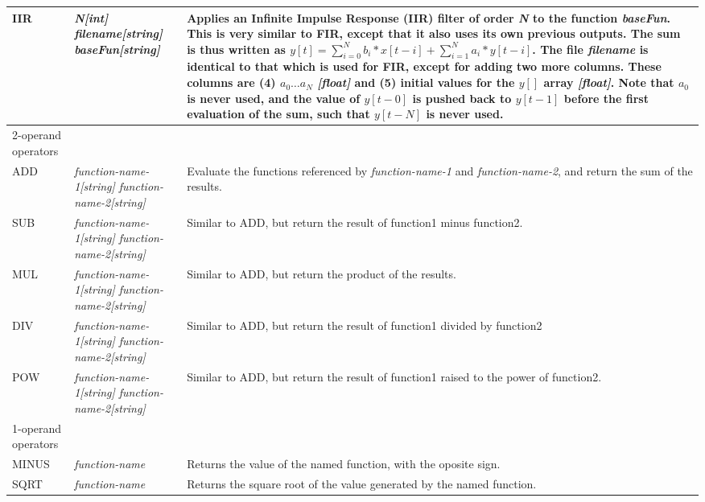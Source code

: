 \begin{center}
\begin{longtable}{|p{2.25cm} | p{4cm} p{9.5cm}|}
  IIR        & \emph{N[int] filename[string] baseFun[string]} &
  Applies an Infinite Impulse Response (IIR) filter of order \emph{N} to the function \emph{baseFun}.
  This is very similar to FIR, except that it also uses its own previous outputs.
  The sum is thus written as $y[t] = \sum_{i=0}^N b_i*x[t-i] + \sum_{i=1}^N a_i*y[t-i]$.
  The file \emph{filename} is identical to that which is used for FIR, except for adding two more columns.
  These columns are (4) $a_0\ldots a_N$ \emph{[float]} and (5) initial values for the $y[]$ array \emph{[float]}.
  Note that $a_0$ is never used, and the value of $y[t-0]$ is pushed back to $y[t-1]$ before the first evaluation of the sum, such that $y[t-N]$ is never used.\\

  \hline
  \rowcolor{blue!15}
  2-operand operators & & \\*

  ADD        & \emph{function-name-1[string] function-name-2[string]} &
  Evaluate the functions referenced by \emph{function-name-1} and \emph{function-name-2}, and return the sum of the results.\\*

  SUB        & \emph{function-name-1[string] function-name-2[string]} &
  Similar to ADD, but return the result of function1 minus function2.\\*
  
  MUL        & \emph{function-name-1[string] function-name-2[string]} & 
  Similar to ADD, but return the product of the results. \\*

  DIV        & \emph{function-name-1[string] function-name-2[string]} & 
  Similar to ADD, but return the result of function1 divided by function2\\*
  
  POW        & \emph{function-name-1[string] function-name-2[string]} & 
  Similar to ADD, but return the result of function1 raised to the power of function2.\\
  
  \hline
  \rowcolor{blue!15}
  1-operand operators & & \\*

  MINUS      & \emph{function-name} &
  Returns the value of the named function, with the oposite sign. \\*

  SQRT       & \emph{function-name} & 
  Returns the square root of the value generated by the named function. \\*
  

\end{longtable}
\end{center}
